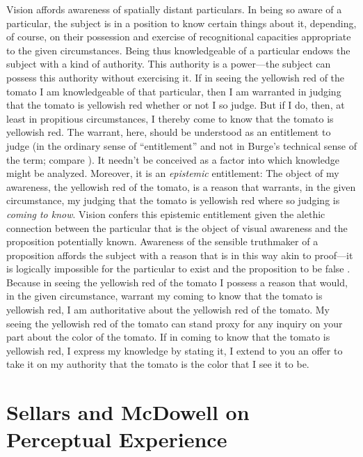 \documentclass[12pt]{article}
\begin{document}
Vision affords awareness of spatially distant particulars. In being so aware of a particular, the subject is in a position to know certain things about it, depending, of course, on their possession and exercise of recognitional capacities appropriate to the given circumstances. Being thus knowledgeable of a particular endows the subject with a kind of authority. This authority is a power---the subject can possess this authority without exercising it. If in seeing the yellowish red of the tomato I am knowledgeable of that particular, then I am warranted in judging that the tomato is yellowish red whether or not I so judge. But if I do, then, at least in propitious circumstances, I thereby come to know that the tomato is yellowish red. The warrant, here, should be understood as an entitlement to judge (in the ordinary sense of ``entitlement'' and not in Burge's \citeyear{Burge:2003fk} technical sense of the term; compare \citealt[132n]{McDowell:2009ys}). It needn't be conceived as a factor into which knowledge might be analyzed. Moreover, it is an \emph{epistemic} entitlement: The object of my awareness, the yellowish red of the tomato, is a reason that warrants, in the given circumstance, my judging that the tomato is yellowish red where so judging is \emph{coming to know}. Vision confers this epistemic entitlement given the alethic connection between the particular that is the object of visual awareness and the proposition potentially known. Awareness of the sensible truthmaker of a proposition affords the subject with a reason that is in this way akin to proof---it is logically impossible for the particular to exist and the proposition to be false \citep[see][]{Cook-Wilson:1926sf,Kalderon:2010fk}. Because in seeing the yellowish red of the tomato I possess a reason that would, in the given circumstance, warrant my coming to know that the tomato is yellowish red, I am authoritative about the yellowish red of the tomato. My seeing the yellowish red of the tomato can stand proxy for any inquiry on your part about the color of the tomato. If in coming to know that the tomato is yellowish red, I express my knowledge by stating it, I extend to you an offer to take it on my authority that the tomato is the color that I see it to be. 


\section{Sellars and McDowell on Perceptual Experience} %
\label{sec:mcdowell_on_sellars_on_perception}
\end{document}
